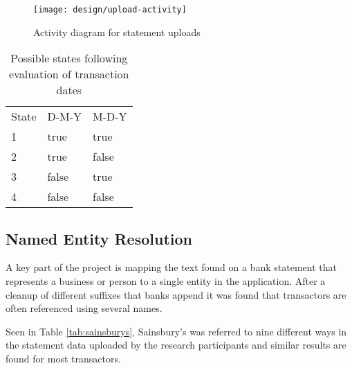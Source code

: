 \begin{figure}[h]
    \centering
    \texttt{[image: design/upload-activity]}
    \caption{Activity diagram for statement uploads}
    \label{fig:fileupload}
    
    \begin{comment}
(start)->(Upload File)->(Identify File Format)-><a>[QIF]->(Identify Date Format)->(Parse Transactions),
<a>[OFX]->(Parse Transactions)->(Remove Duplicates)->(end),
<a>[Other]->(Reject Upload)
    \end{comment}
\end{figure}

\begin{table}[h]
\centering
\begin{tabular}{lll}
State & D-M-Y & M-D-Y \\
1     & true  & true  \\
2     & true  & false \\
3     & false & true  \\
4     & false & false
\end{tabular}
\caption{Possible states following evaluation of transaction dates}
\label{table:datestates}
\end{table}

% 

\subsection{Named Entity Resolution}

A key part of the project is mapping the text found on a bank statement that represents a business or person to a single entity in the application. After a cleanup of different suffixes that banks append it was found that transactors are often referenced using several names.

Seen in Table \ref{tab:sainsburys}, Sainsbury's was referred to nine different ways in the statement data uploaded by the research participants and similar results are found for most \glspl{transactor}.

